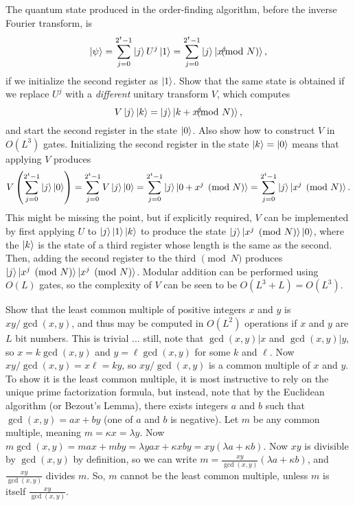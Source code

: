 The quantum state produced in the order-finding algorithm, before the inverse Fourier transform, is $$\ket{\psi} = \sum_{j=0}^{2^t-1}\ket{j}U^j\ket{1} = \sum_{j=0}^{2^t-1}\ket{j}\ket{x^j\hspace{-10pt}\pmod{N}},$$ if we initialize the second register as $\ket{1}$.  Show that the same state is obtained if we replace $U^j$ with a \textit{different} unitary transform $V$, which computes $$V\ket{j}{\ket{k}} = \ket{j}\ket{k+x^j\hspace{-10pt}\pmod{N}},$$ and start the second register in the state $\ket{0}$.  Also show how to construct $V$ in $O(L^3)$ gates.
\Soln Initializing the second register in the state $\ket{k} = \ket{0}$ means that applying $V$ produces $$V\left(\sum_{j=0}^{2^t-1}\ket{j}\ket{0}\right) = \sum_{j=0}^{2^t-1}V\ket{j}\ket{0} = \sum_{j=0}^{2^t-1}\ket{j}\ket{0+x^j\pmod{N}} = \sum_{j=0}^{2^t-1}\ket{j}\ket{x^j\pmod{N}}.$$  This might be missing the point, but if explicitly required, $V$ can be implemented by first applying $U$ to $\ket{j}\ket{1}\ket{k}$ to produce the state $\ket{j}\ket{x^j\pmod{N}}\ket{0}$, where the $\ket{k}$ is the state of a third register whose length is the same as the second.  Then, adding the second register to the third $\pmod{N}$ produces $\ket{j}\ket{x^j\pmod{N}}\ket{x^j\pmod{N}}$.  Modular addition can be performed using $O(L)$ gates, so the complexity of $V$ can be seen to be $O(L^3+L)=O(L^3)$.

 Show that the least common multiple of positive integers $x$ and $y$ is $xy/\gcd(x,y)$, and thus may be computed in $O(L^2)$ operations if $x$ and $y$ are $L$ bit numbers.
\Soln This is trivial ... still, note that $\gcd(x,y) | x$ and $\gcd(x,y) | y$, so $x = k\gcd(x,y)$ and $y=\ell\gcd(x,y)$ for some $k$ and $\ell$.  Now $xy/\gcd(x,y) = x\ell = ky$, so $xy/\gcd(x,y)$ is a common multiple of $x$ and $y$. To show it is the least common multiple, it is most instructive to rely on the unique prime factorization formula, but instead, note that by the Euclidean algorithm (or Bezout's Lemma), there exists integers $a$ and $b$ such that $\gcd(x,y) = ax+by$ (one of $a$ and $b$ is negative).  Let $m$ be any common multiple, meaning $m=\kappa x=\lambda y$.  Now $m\gcd(x,y)=max+mby=\lambda yax + \kappa xby = xy(\lambda a + \kappa b)$. Now $xy$ is divisible by $\gcd(x,y)$ by definition, so we can write $m = \frac{xy}{\gcd(x,y)}(\lambda a + \kappa b)$, and $\frac{xy}{\gcd(x,y)}$ divides $m$. So, $m$ cannot be the least common multiple, unless $m$ is itself $\frac{xy}{\gcd(x,y)}$.

